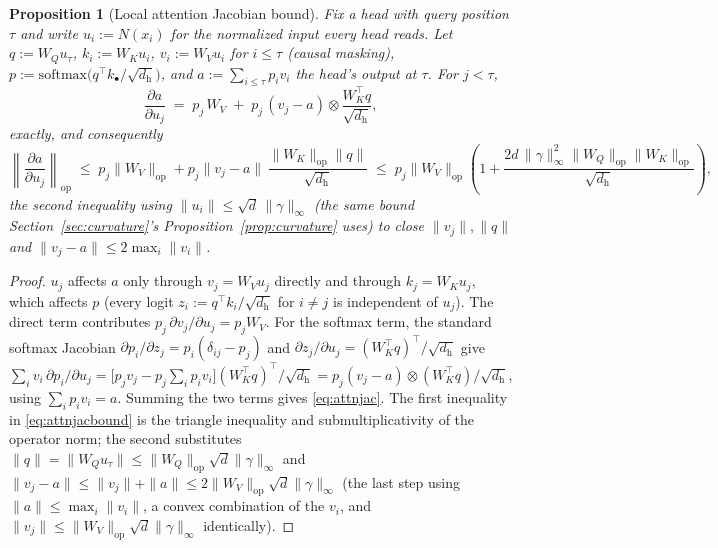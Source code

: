 \documentclass[11pt,a4paper]{article}
\newtheorem{proposition}{Proposition}
\begin{document}
\begin{proposition}[Local attention Jacobian bound]
\label{prop:attnjacobian}
Fix a head with query position $\tau$ and write $u_i:=N(x_i)$ for the
normalized input every head reads. Let $q:=W_Qu_\tau$,
$k_i:=W_Ku_i$, $v_i:=W_Vu_i$ for $i\le\tau$ (causal masking),
$p:=\mathrm{softmax}\bigl(q^\top k_\bullet/\sqrt{d_{\mathrm h}}\bigr)$, and
$a:=\sum_{i\le\tau}p_iv_i$ the head's output at $\tau$. For $j<\tau$,
\begin{equation}
\label{eq:attnjac}
\frac{\partial a}{\partial u_j} \;=\; p_j\,W_V \;+\; p_j\,(v_j-a)\otimes\frac{W_K^\top q}{\sqrt{d_{\mathrm h}}},
\end{equation}
exactly, and consequently
\begin{equation}
\label{eq:attnjacbound}
\left\|\frac{\partial a}{\partial u_j}\right\|_{\mathrm{op}}
\;\le\; p_j\|W_V\|_{\mathrm{op}} + p_j\|v_j-a\|\,\frac{\|W_K\|_{\mathrm{op}}\|q\|}{\sqrt{d_{\mathrm h}}}
\;\le\; p_j\|W_V\|_{\mathrm{op}}\left(1+\frac{2d\,\|\gamma\|_\infty^2\|W_Q\|_{\mathrm{op}}\|W_K\|_{\mathrm{op}}}{\sqrt{d_{\mathrm h}}}\right),
\end{equation}
the second inequality using $\|u_i\|\le\sqrt d\,\|\gamma\|_\infty$ (the same
bound Section~\ref{sec:curvature}'s Proposition~\ref{prop:curvature} uses)
to close $\|v_j\|,\|q\|$ and $\|v_j-a\|\le2\max_i\|v_i\|$.
\end{proposition}

\begin{proof}
$u_j$ affects $a$ only through $v_j=W_Vu_j$ directly and through $k_j=W_Ku_j$,
which affects $p$ (every logit $z_i:=q^\top k_i/\sqrt{d_{\mathrm h}}$ for
$i\ne j$ is independent of $u_j$). The direct term contributes
$p_j\,\partial v_j/\partial u_j=p_jW_V$. For the softmax term, the standard
softmax Jacobian $\partial p_i/\partial z_j=p_i(\delta_{ij}-p_j)$ and
$\partial z_j/\partial u_j=(W_K^\top q)^\top/\sqrt{d_{\mathrm h}}$ give
$\sum_iv_i\,\partial p_i/\partial u_j
=\bigl[p_jv_j-p_j\sum_ip_iv_i\bigr](W_K^\top q)^\top/\sqrt{d_{\mathrm h}}
=p_j(v_j-a)\otimes(W_K^\top q)/\sqrt{d_{\mathrm h}}$, using
$\sum_ip_iv_i=a$. Summing the two terms gives \eqref{eq:attnjac}. The first
inequality in \eqref{eq:attnjacbound} is the triangle inequality and
submultiplicativity of the operator norm; the second substitutes
$\|q\|=\|W_Qu_\tau\|\le\|W_Q\|_{\mathrm{op}}\sqrt d\|\gamma\|_\infty$ and
$\|v_j-a\|\le\|v_j\|+\|a\|\le2\|W_V\|_{\mathrm{op}}\sqrt d\|\gamma\|_\infty$
(the last step using $\|a\|\le\max_i\|v_i\|$, a convex combination of the
$v_i$, and $\|v_j\|\le\|W_V\|_{\mathrm{op}}\sqrt d\|\gamma\|_\infty$
identically).
\end{proof}
\end{document}
